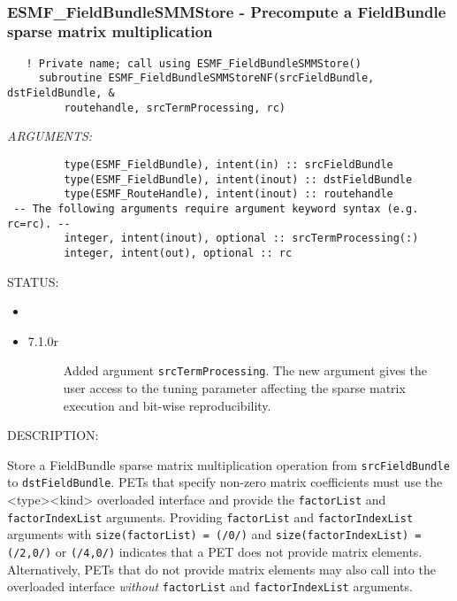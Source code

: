  
\mbox{}\hrulefill\ 
 
\subsubsection [ESMF\_FieldBundleSMMStore] {ESMF\_FieldBundleSMMStore - Precompute a FieldBundle sparse matrix multiplication}


  
\begin{verbatim}   ! Private name; call using ESMF_FieldBundleSMMStore()
     subroutine ESMF_FieldBundleSMMStoreNF(srcFieldBundle, dstFieldBundle, &
         routehandle, srcTermProcessing, rc)\end{verbatim}{\em ARGUMENTS:}
\begin{verbatim}         type(ESMF_FieldBundle), intent(in) :: srcFieldBundle
         type(ESMF_FieldBundle), intent(inout) :: dstFieldBundle
         type(ESMF_RouteHandle), intent(inout) :: routehandle
 -- The following arguments require argument keyword syntax (e.g. rc=rc). --
         integer, intent(inout), optional :: srcTermProcessing(:)
         integer, intent(out), optional :: rc\end{verbatim}
{\sf STATUS:}
   \begin{itemize}
   \item{}
   \item{}
   \begin{description}
   \item[7.1.0r] Added argument {\tt srcTermProcessing}.
   The new argument gives the user access to the tuning parameter
   affecting the sparse matrix execution and bit-wise
   reproducibility.
   \end{description}
   \end{itemize}
  
{\sf DESCRIPTION:\\ }


  
   \begin{sloppypar}
   Store a FieldBundle sparse matrix multiplication operation from {\tt srcFieldBundle}
   to {\tt dstFieldBundle}. PETs that specify non-zero matrix coefficients must use
   the <type><kind> overloaded interface and provide the {\tt factorList} and
   {\tt factorIndexList} arguments. Providing {\tt factorList} and
   {\tt factorIndexList} arguments with {\tt size(factorList) = (/0/)} and
   {\tt size(factorIndexList) = (/2,0/)} or {\tt (/4,0/)} indicates that a
   PET does not provide matrix elements. Alternatively, PETs that do not
   provide matrix elements may also call into the overloaded interface
   {\em without} {\tt factorList} and {\tt factorIndexList} arguments.
   \end{sloppypar}
  
